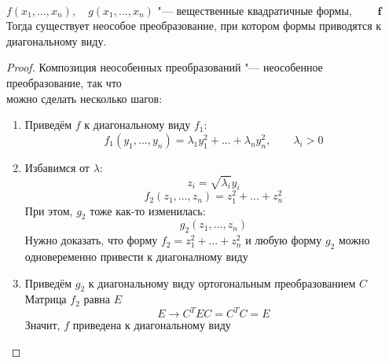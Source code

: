 \begin{theorem}
	\hfill \\
	$ f(x_1, ..., x_n), \quad g(x_1, ..., x_n) $ "--- вещественные квадратичные формы, $ \qquad \bm f $  \\
	Тогда существует неособое преобразование, при котором  формы приводятся к диагональному виду.
\end{theorem}

\begin{proof}
	Композиция неособенных преобразований "--- неособенное преобразование, так что \\
	можно сделать несколько шагов:
	\begin{enumerate}
		\item Приведём $ f $ к диагональному виду $ f_1 $:
		$$ f_1(y_1, ..., y_n) = \lambda_1y_1^2 + ... + \lambda_ny_n^2, \qquad \lambda_i > 0 $$
		\item Избавимся от $ \lambda $:
		$$ z_i = \sqrt{\lambda_i}y_i $$
		$$ f_2(z_1, ..., z_n) = z_1^2 + ... + z_n^2 $$
		При этом, $ g_2 $ тоже как-то изменилась:
		$$ g_2(z_1, ..., z_n) $$
		Нужно доказать, что форму $ f_2 = z_1^2 + ... + z_n^2 $ и любую форму $ g_2 $ можно одновеременно привести к диагоналному виду
		\item Приведём $ g_2 $ к диагональному виду ортогональным преобразованием $ C $ \\
		Матрица $ f_2 $ равна $ E $
		$$ E \to C^TEC = C^TC = E $$
		Значит, $ f $ приведена к диагональному виду
	\end{enumerate}
\end{proof}
